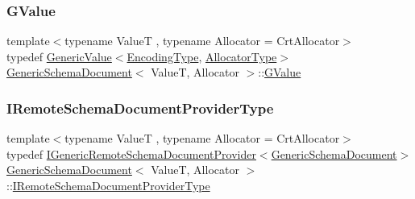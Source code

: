 \mbox{\label{classGenericSchemaDocument_a777505b09fff6cf23b8cfed9e0350eec}} 
\subsubsection{\texorpdfstring{G\+Value}{GValue}}
{\footnotesize\ttfamily template$<$typename ValueT , typename Allocator  = Crt\+Allocator$>$ \\
typedef \hyperlink{classGenericValue}{Generic\+Value}$<$\hyperlink{classGenericSchemaDocument_ad0293c28c9ffe80ab1f8ec86efee35c8}{Encoding\+Type}, \hyperlink{classGenericSchemaDocument_ac0d88adf8c86917d8bc9563ffdab6a6d}{Allocator\+Type}$>$ \hyperlink{classGenericSchemaDocument}{Generic\+Schema\+Document}$<$ ValueT, Allocator $>$\+::\hyperlink{classGenericSchemaDocument_a777505b09fff6cf23b8cfed9e0350eec}{G\+Value}}

\mbox{\label{classGenericSchemaDocument_aa53ca323efce50f88aea6fa0d03e9785}} 
\subsubsection{\texorpdfstring{I\+Remote\+Schema\+Document\+Provider\+Type}{IRemoteSchemaDocumentProviderType}}
{\footnotesize\ttfamily template$<$typename ValueT , typename Allocator  = Crt\+Allocator$>$ \\
typedef \hyperlink{classIGenericRemoteSchemaDocumentProvider}{I\+Generic\+Remote\+Schema\+Document\+Provider}$<$\hyperlink{classGenericSchemaDocument}{Generic\+Schema\+Document}$>$ \hyperlink{classGenericSchemaDocument}{Generic\+Schema\+Document}$<$ ValueT, Allocator $>$\+::\hyperlink{classGenericSchemaDocument_aa53ca323efce50f88aea6fa0d03e9785}{I\+Remote\+Schema\+Document\+Provider\+Type}}

\mbox{\label{classGenericSchemaDocument_aeb62f562d4dc024402b00f97cbcef747}} 
